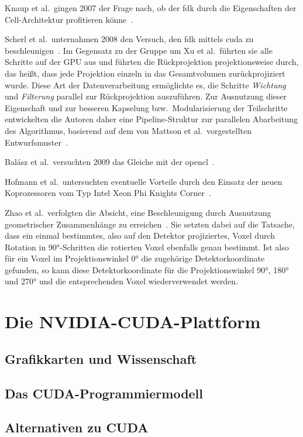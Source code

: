 Knaup et al.\ gingen 2007 der Frage nach, ob der \gls{fdk} durch die Eigenschaften der Cell-Architektur profitieren
könne~\cite{knaupsteck}.

Scherl et al.\ unternahmen 2008 den Versuch, den \gls{fdk} mittels \gls{cuda} zu beschleunigen~\cite{scherlkeck}. Im
Gegensatz zu der Gruppe um Xu et al.\ führten sie alle Schritte auf der GPU aus und führten die Rückprojektion
projektionsweise durch, das heißt, dass jede Projektion einzeln in das Gesamtvolumen zurückprojiziert wurde. Diese Art
der Datenverarbeitung ermöglichte es, die Schritte \textit{Wichtung} und \textit{Filterung} parallel zur Rückprojektion
auszuführen. Zur Ausnutzung dieser Eigenschaft und zur besseren Kapselung bzw.\ Modularisierung der Teilschritte
entwickelten die Autoren daher eine Pipeline-Struktur zur parallelen Abarbeitung des Algorithmus, basierend auf dem von
Mattson et al.\ vorgestellten Entwurfsmuster~\cite{mattsan}.

Balász et al.\ versuchten 2009 das Gleiche mit der \gls{opencl}~\cite{balgab}.

Hofmann et al.\ untersuchten eventuelle Vorteile durch den Einsatz der neuen Koprozessoren vom Typ 
Intel{\textregistered} Xeon Phi{\texttrademark} {\glq}Knights Corner{\grq}~\cite{hoftrei}.

Zhao et al.\ verfolgten die Absicht, eine Beschleunigung durch Ausnutzung geometrischer Zusammenhänge zu
erreichen~\cite{zhao}. Sie setzten dabei auf die Tatsache, dass ein einmal bestimmtes, also auf den Detektor
projiziertes, Voxel durch Rotation in 90°-Schritten die rotierten Voxel ebenfalls genau bestimmt. Ist also für ein
Voxel im Projektionswinkel 0° die zugehörige Detektorkoordinate gefunden, so kann diese Detektorkoordinate
für die Projektionswinkel 90°, 180° und 270° und die entsprechenden Voxel wiederverwendet werden.

\section{Die NVIDIA{\textregistered}-CUDA{\textregistered}-Plattform}

\subsection{Grafikkarten und Wissenschaft}

\subsection{Das CUDA{\textregistered}-Programmiermodell}

\subsection{Alternativen zu CUDA{\textregistered}}
